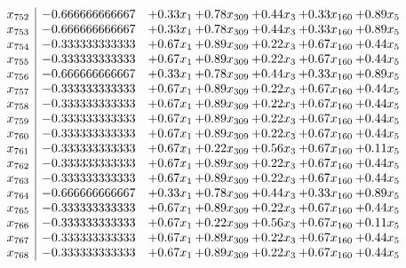 \documentclass[8pt]{article}
\begin{document}
\[\begin{array}{c| c c@{\hskip 2pt} c@{\hskip 2pt} c@{\hskip 2pt} c@{\hskip 2pt} c@{\hskip 2pt} }
 x_{752}   &  -0.666666666667 & +  0.33 x_{1} & +  0.78 x_{309} & +  0.44 x_{3} & +  0.33 x_{160} & +  0.89 x_{5}\\
 x_{753}   &  -0.666666666667 & +  0.33 x_{1} & +  0.78 x_{309} & +  0.44 x_{3} & +  0.33 x_{160} & +  0.89 x_{5}\\
 x_{754}   &  -0.333333333333 & +  0.67 x_{1} & +  0.89 x_{309} & +  0.22 x_{3} & +  0.67 x_{160} & +  0.44 x_{5}\\
 x_{755}   &  -0.333333333333 & +  0.67 x_{1} & +  0.89 x_{309} & +  0.22 x_{3} & +  0.67 x_{160} & +  0.44 x_{5}\\
 x_{756}   &  -0.666666666667 & +  0.33 x_{1} & +  0.78 x_{309} & +  0.44 x_{3} & +  0.33 x_{160} & +  0.89 x_{5}\\
 x_{757}   &  -0.333333333333 & +  0.67 x_{1} & +  0.89 x_{309} & +  0.22 x_{3} & +  0.67 x_{160} & +  0.44 x_{5}\\
 x_{758}   &  -0.333333333333 & +  0.67 x_{1} & +  0.89 x_{309} & +  0.22 x_{3} & +  0.67 x_{160} & +  0.44 x_{5}\\
 x_{759}   &  -0.333333333333 & +  0.67 x_{1} & +  0.89 x_{309} & +  0.22 x_{3} & +  0.67 x_{160} & +  0.44 x_{5}\\
 x_{760}   &  -0.333333333333 & +  0.67 x_{1} & +  0.89 x_{309} & +  0.22 x_{3} & +  0.67 x_{160} & +  0.44 x_{5}\\
 x_{761}   &  -0.333333333333 & +  0.67 x_{1} & +  0.22 x_{309} & +  0.56 x_{3} & +  0.67 x_{160} & +  0.11 x_{5}\\
 x_{762}   &  -0.333333333333 & +  0.67 x_{1} & +  0.89 x_{309} & +  0.22 x_{3} & +  0.67 x_{160} & +  0.44 x_{5}\\
 x_{763}   &  -0.333333333333 & +  0.67 x_{1} & +  0.89 x_{309} & +  0.22 x_{3} & +  0.67 x_{160} & +  0.44 x_{5}\\
 x_{764}   &  -0.666666666667 & +  0.33 x_{1} & +  0.78 x_{309} & +  0.44 x_{3} & +  0.33 x_{160} & +  0.89 x_{5}\\
 x_{765}   &  -0.333333333333 & +  0.67 x_{1} & +  0.89 x_{309} & +  0.22 x_{3} & +  0.67 x_{160} & +  0.44 x_{5}\\
 x_{766}   &  -0.333333333333 & +  0.67 x_{1} & +  0.22 x_{309} & +  0.56 x_{3} & +  0.67 x_{160} & +  0.11 x_{5}\\
 x_{767}   &  -0.333333333333 & +  0.67 x_{1} & +  0.89 x_{309} & +  0.22 x_{3} & +  0.67 x_{160} & +  0.44 x_{5}\\
 x_{768}   &  -0.333333333333 & +  0.67 x_{1} & +  0.89 x_{309} & +  0.22 x_{3} & +  0.67 x_{160} & +  0.44 x_{5}\\

\end{array}\]
\end{document}
